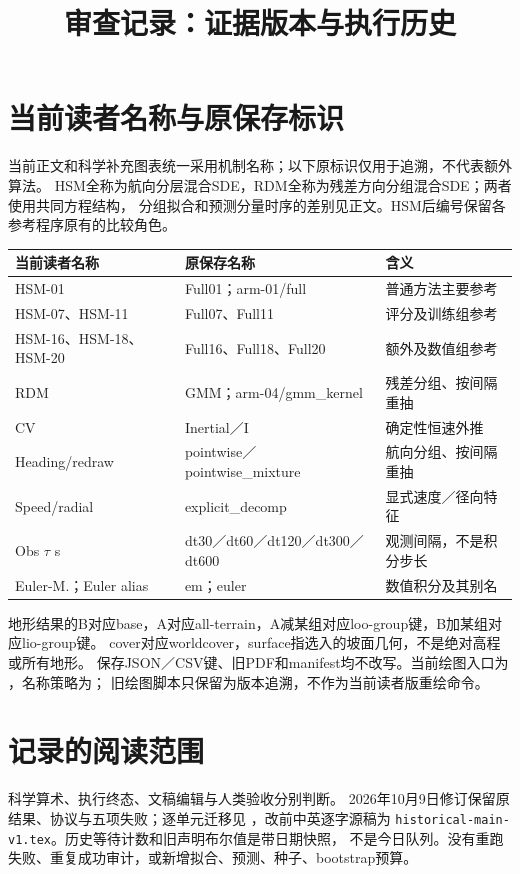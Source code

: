 
\title{审查记录：证据版本与执行历史}
\maketitle

\section{当前读者名称与原保存标识}\label{sec:reader-names}
当前正文和科学补充图表统一采用机制名称；以下原标识仅用于追溯，不代表额外算法。
HSM全称为航向分层混合SDE，RDM全称为残差方向分组混合SDE；两者使用共同方程结构，
分组拟合和预测分量时序的差别见正文。HSM后编号保留各参考程序原有的比较角色。
\begin{center}\small
\begin{tabular}{p{.22\linewidth}p{.40\linewidth}p{.30\linewidth}}\toprule
当前读者名称 & 原保存名称 & 含义\\\midrule
HSM-01 & Full01；arm-01/full & 普通方法主要参考\\
HSM-07、HSM-11 & Full07、Full11 & 评分及训练组参考\\
HSM-16、HSM-18、HSM-20 & Full16、Full18、Full20 & 额外及数值组参考\\
RDM & GMM；arm-04/gmm\_kernel & 残差分组、按间隔重抽\\
CV & Inertial／I & 确定性恒速外推\\
Heading/redraw & pointwise／pointwise\_mixture & 航向分组、按间隔重抽\\
Speed/radial & explicit\_decomp & 显式速度／径向特征\\
Obs $\tau$ s & dt30／dt60／dt120／dt300／dt600 & 观测间隔，不是积分步长\\
Euler-M.；Euler alias & em；euler & 数值积分及其别名\\\bottomrule
\end{tabular}\end{center}
地形结果的B对应base，A对应all-terrain，A减某组对应loo-group键，B加某组对应lio-group键。
cover对应worldcover，surface指选入的坡面几何，不是绝对高程或所有地形。
保存JSON／CSV键、旧PDF和manifest均不改写。当前绘图入口为
，名称策略为；
旧绘图脚本只保留为版本追溯，不作为当前读者版重绘命令。
\section{记录的阅读范围}
科学算术、执行终态、文稿编辑与人类验收分别判断。
2026年10月9日修订保留原结果、协议与五项失败；逐单元迁移见
，改前中英逐字源稿为
\texttt{historical-main-v1.tex}。历史等待计数和旧声明布尔值是带日期快照，
不是今日队列。没有重跑失败、重复成功审计，或新增拟合、预测、种子、bootstrap预算。

